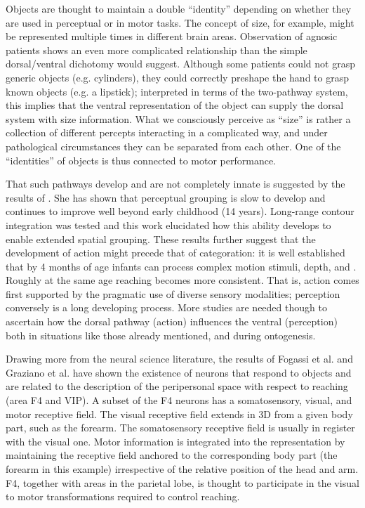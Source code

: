 
Objects are thought to maintain a double ``identity'' depending on
whether they are used in perceptual or in motor tasks. The concept of
size, for example, might be represented multiple times in different
brain areas. Observation of agnosic
patients \cite{jeannerod97cognitive} shows an even more complicated
relationship than the simple dorsal/ventral dichotomy would
suggest.  Although some patients could not grasp generic objects
(e.g. cylinders), they could correctly preshape the hand to grasp
known objects (e.g. a lipstick); interpreted in terms of the
two-pathway system, this implies that the ventral representation of
the object can supply the dorsal system with size information. What we
consciously perceive as ``size'' is rather a collection of different
percepts interacting in a complicated way, and under pathological
circumstances they can be separated from each other. One of the
``identities'' of objects is thus connected to motor performance.

That such pathways develop and are not completely innate is suggested
by the results of \cite{kovacs00human}. She has shown that
perceptual grouping is slow to develop and continues to improve well
beyond early childhood (14 years). Long-range contour integration was
tested and this work elucidated how this ability develops to enable
extended spatial grouping. These results further suggest that the
development of action might precede that of categor\iz{}ation: it is well
established that by 4 months of age infants can process complex
motion stimuli, depth, and \ahhcolor{}.  Roughly at the same age reaching
becomes more consistent.  That is, action comes first
supported by the pragmatic use of diverse sensory modalities;
perception conversely is a long developing process. More studies are
needed though to ascertain how the dorsal pathway (action) influences
the ventral (perception) both in situations like those
already mentioned, and during ontogenesis.

Drawing more from the neural science literature, the results of Fogassi et al.
\cite{fogassi96coding} and Graziano et al. \cite{graziano-hu-gross-1997} have 
shown the existence of neurons that respond to objects and are related to the
description of the peripersonal space with respect to reaching (area F4 and VIP).
A subset of the F4 neurons has a somatosensory, visual, and motor receptive
field. The visual receptive field extends in 3D from a given body part, such
as the forearm. The somatosensory receptive field is usually in register with
the visual one. Motor information is integrated into the representation 
by maintaining the receptive field anchored to the corresponding body part
(the forearm in this example) irrespective of the relative position of the
head and arm. F4, together with areas in the parietal lobe, is thought to 
participate in the visual to motor transformations required to control 
reaching.

